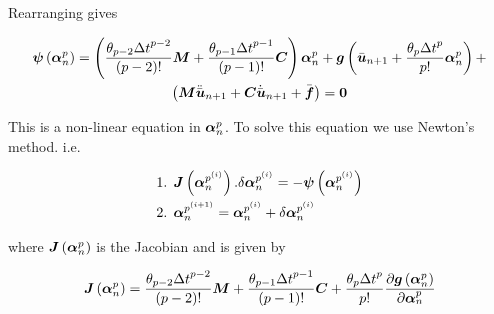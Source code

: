 Rearranging gives

\begin{multline}
  \fnof{\vect{\psi}}{\vect{\alpha}^{p}_{n}}=\pbrac{\dfrac{\theta_{p-2}{\Delta
        t}^{p-2}}{\factorial{p-2}}\matr{M}+\dfrac{\theta_{p-1}{\Delta
        t}^{p-1}}{\factorial{p-1}}\matr{C}}\vect{\alpha}^{p}_{n}+\fnof{\vect{g}}{\bar{\vect{u}}_{n+1}+\dfrac{\theta_{p}{\Delta
        t}^{p}}{p!}\vect{\alpha}^{p}_{n}}+ \\
  \pbrac{\matr{M}\ddot{\bar{\vect{u}}}_{n+1}+\matr{C}\dot{\bar{\vect{u}}}_{n+1}+
    \bar{\vect{f}}}= \vect{0}
\end{multline}

This is a non-linear equation in $\vect{\alpha}^{p}_{n}$. To solve this
equation we use Newton's method. i.e.

\begin{equation}
  \begin{split}
    \text{1.  } & \fnof{\matr{J}}{\vect{\alpha}^{p^{(i)}}_{n}}.\delta
    \vect{\alpha}^{p^{(i)}}_{n} = -\fnof{\vect{\psi}}{\vect{\alpha}^{p^{(i)}}_{n}}
    \\
    \text{2.  } & \vect{\alpha}^{p^{(i+1)}}_{n}=\vect{\alpha}^{p^{(i)}}_{n}+\delta
    \vect{\alpha}^{p^{(i)}}_{n}
  \end{split}
\end{equation}

where $\fnof{\matr{J}}{\vect{\alpha}^{p}_{n}}$ is the Jacobian and is given by

\begin{equation}
  \fnof{\matr{J}}{\vect{\alpha}^{p}_{n}}=\dfrac{\theta_{p-2}{\Delta t}^{p-2}}{\factorial{p-2}}\matr{M}+\dfrac{\theta_{p-1}{\Delta
      t}^{p-1}}{\factorial{p-1}}\matr{C}+\dfrac{\theta_{p}{\Delta t}^{p}}{p!}
  \delby{\fnof{\vect{g}}{\vect{\alpha}^{p}_{n}}}{\vect{\alpha}^{p}_{n}}
\end{equation}
